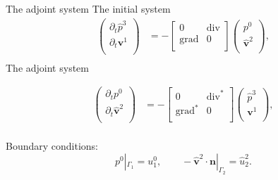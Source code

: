\documentclass[aspectratio=169]{beamer}
\DeclareMathOperator*{\grad}{grad}
\renewcommand{\div}{\operatorname{div}}
\newcommand*{\dual}[1]{\ensuremath{\widehat{#1}}}
\begin{document}
	\begin{frame}{The adjoint system}
		The initial system
		\begin{equation*}
			\begin{aligned}
				\begin{pmatrix}
					\partial_t \dual{p}^3 \\
					\partial_t \bm{v}^1\\
				\end{pmatrix} &= 
				-\begin{bmatrix}
					0 & \div \\
					\grad & 0 \\
				\end{bmatrix}
				\begin{pmatrix}
					p^0\\
					\dual{\bm{v}}^2\\
				\end{pmatrix}, \\
			\end{aligned}	
		\end{equation*}
		The adjoint system
		
		\begin{equation*}
			\begin{aligned}
				\begin{pmatrix}
					\partial_t p^0 \\
					\partial_t \dual{\bm{v}}^2\\
				\end{pmatrix} &= 
				-\begin{bmatrix}
					0 & \div^* \\
					\grad^* & 0 \\
				\end{bmatrix}
				\begin{pmatrix}
					\dual{p}^3\\
					\bm{v}^1\\
				\end{pmatrix}, \\
			\end{aligned}	
		\end{equation*}
		
		Boundary conditions:
		\begin{equation*}
			p^0|_{\Gamma_1} = u^0_1, \qquad
			-\dual{\bm{v}}^2\cdot \bm{n}|_{\Gamma_2}  = \dual{u}^{2}_2.
		\end{equation*}
		
	\end{frame}
	
\end{document}
